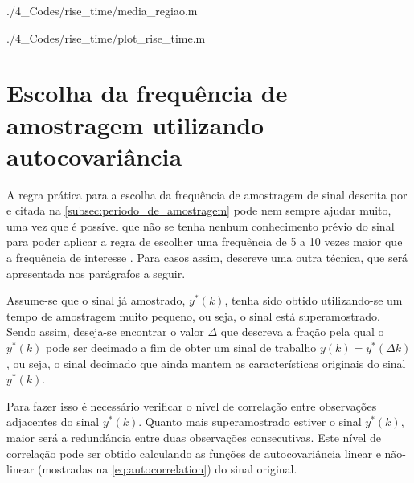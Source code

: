 \begin{apendicesenv}

	{./4_Codes/rise_time/media_regiao.m}
	\begin{center}
	\end{center}


	{./4_Codes/rise_time/plot_rise_time.m}
	\begin{center}
	\end{center}

\chapter{Escolha da frequência de amostragem utilizando autocovariância}
\label{ch:sampling_time_using_autocorrelation}

A regra prática para a escolha da frequência de amostragem de sinal descrita por 
e citada na \cref{subsec:periodo_de_amostragem} pode nem sempre ajudar muito, uma vez que é possível
que não se tenha nenhum conhecimento prévio do sinal para poder aplicar a regra de escolher uma frequência
de 5 a 10 vezes maior que a frequência de interesse \cite{Aguirre2015}. Para casos assim, 
descreve uma outra técnica, que será apresentada nos parágrafos a seguir. 

Assume-se que o sinal já amostrado, $y^*(k)$, tenha sido obtido utilizando-se um tempo
de amostragem muito pequeno, ou seja, o sinal está superamostrado. Sendo assim, deseja-se encontrar o
valor $\Delta$ que descreva a fração pela qual o $y^*(k)$ pode ser decimado a fim de obter um sinal de trabalho
$y(k) = y^*(\Delta k)$, ou seja, o sinal decimado que ainda mantem as características originais do sinal $y^*(k)$.

Para fazer isso é necessário verificar o nível de correlação entre observações adjacentes do sinal
$y^*(k)$. Quanto mais superamostrado estiver o sinal $y^*(k)$, maior será a redundância entre duas
observações consecutivas. Este nível de correlação pode ser obtido calculando as funções de
autocovariância linear e não-linear (mostradas na \cref{eq:autocorrelation}) do sinal original.


\end{apendicesenv}
